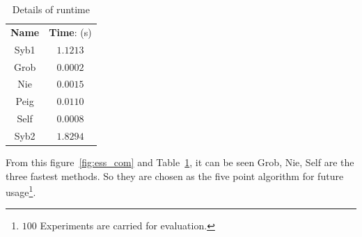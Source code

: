 \begin{table}[h!]
\centering
\caption{Details of runtime}
\begin{tabular}{c||c}
\hline
\textbf{Name} & \textbf{Time}: (s) \\
 Syb1 & $1.1213$ \\
 Grob & $0.0002$ \\
 Nie & $0.0015$ \\
 Peig & $0.0110$ \\
 Self & $0.0008$ \\
 Syb2 & $1.8294$ \\ 
 \hline
\end{tabular}
\label{tb:ess_com}
\end{table}
From this figure~\ref{fig:ess_com} and Table~\ref{tb:ess_com}, it can be seen Grob, Nie, Self are the three fastest methods. So they are chosen as the five point algorithm for future usage\footnote{$100$ Experiments are carried for evaluation.}.
